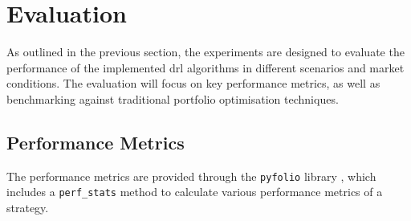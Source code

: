 

\section{Evaluation} \label{sec:evaluation}

As outlined in the previous section, the experiments are designed to evaluate the performance of the implemented \acrshort{drl} algorithms in different scenarios and market conditions. The evaluation will focus on key performance metrics, as well as benchmarking against traditional portfolio optimisation techniques.

\subsection{Performance Metrics} \label{sec:performance-metrics}

The performance metrics are provided through the \texttt{pyfolio} library \cite{pyfolio}, which includes a \texttt{perf\_stats} method to calculate various performance metrics of a strategy. 

